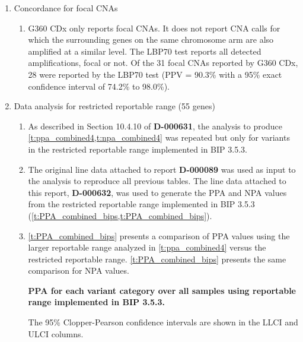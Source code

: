 \documentclass[12pt]{protocol}
\begin{document}
\begin{enumerate}
\begin{enumerate}
    \end{enumerate}
	
    \item Concordance for focal CNAs

	\begin{enumerate}
      \item G360 CDx only reports focal CNAs. It does not report CNA calls for which the
          surrounding genes on the same chromosome arm are also amplified at a similar level. The
          LBP70 test reports all detected amplifications, focal or not. Of the 31 focal CNAs
          reported by G360 CDx, 28 were reported by the LBP70 test (PPV = 90.3\% with a 95\%
          exact confidence interval of 74.2\% to 98.0\%).
    \end{enumerate}
    
    \color{blue}
    \item Data analysis for restricted reportable range (55 genes)
    \begin{enumerate}
        \item As described in Section 10.4.10 of \textbf{D-000631}, the analysis to produce
            \cref{t:ppa_combined4,t:npa_combined4} was repeated but only for variants in the
            restricted reportable range implemented in BIP 3.5.3.
        
        \item The original line data attached to report \textbf{D-000089} was used
        	as input to the analysis to reproduce all previous tables. The line
        	data attached to this report, \textbf{D-000632}, was used to generate
        	the PPA and NPA values from the restricted reportable range
        	implemented in BIP 3.5.3 (\cref{t:PPA_combined_bips,t:PPA_combined_bips}). 
        
        \item \cref{t:PPA_combined_bips} presents a comparison of PPA values 
        	using the larger reportable range analyzed in 
       		\cref{t:ppa_combined4} versus the
       		restricted reportable range. \cref{t:PPA_combined_bips} presents
       		the same comparison for NPA values.
            
        \captionsetup{justification=justified,singlelinecheck=off,skip=0pt}
        \begin{table}[H]
        \color{blue}
        \centering
        \begin{threeparttable}
        \caption{\textbf{PPA for each variant category over all samples using reportable range
            implemented in BIP 3.5.3.}}
        \label{t:PPA_combined_bips}
        
        \caption*{The 95\% Clopper-Pearson confidence intervals are shown 
        in the LLCI and ULCI columns.}
        \end{threeparttable}
        \end{table}
        

\end{enumerate}
\end{enumerate}
\end{document}
